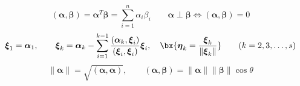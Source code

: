 \begin{secbox}
\begin{formbox}
\[
(\boldsymbol\alpha,\boldsymbol\beta)
=\boldsymbol\alpha^{T}\boldsymbol\beta=\sum_{i=1}^{n}\alpha_{i}\beta_{i}
\qquad
\boldsymbol\alpha\perp\boldsymbol\beta\iff(\boldsymbol\alpha,\boldsymbol\beta)=0
\]
\[
\boldsymbol\xi_{1}=\boldsymbol\alpha_{1},\qquad
\boldsymbol\xi_{k}=\boldsymbol\alpha_{k}
-\sum_{i=1}^{k-1}\frac{(\boldsymbol\alpha_{k},\boldsymbol\xi_{i})}{(\boldsymbol\xi_{i},\boldsymbol\xi_{i})}\boldsymbol\xi_{i},
\quad
\bx{\boldsymbol\eta_{k}=\frac{\boldsymbol\xi_{k}}{\lVert\boldsymbol\xi_{k}\rVert}}
\qquad(k=2,3,\dots,s)
\]
\[
\lVert\boldsymbol\alpha\rVert=\sqrt{(\boldsymbol\alpha,\boldsymbol\alpha)},
\qquad
(\boldsymbol\alpha,\boldsymbol\beta)=\lVert\boldsymbol\alpha\rVert\lVert\boldsymbol\beta\rVert\cos\theta
\]
\end{formbox}
\end{secbox}

